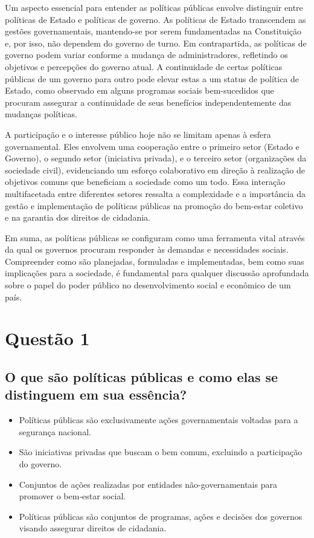 \documentclass[
   article,       
   12pt,          
   oneside,       
   a4paper,       
   english,       
   brazil,        
   sumario=tradicional
   ]{abntex2}
\begin{document}
Um aspecto essencial para entender as políticas públicas envolve distinguir entre políticas de Estado e políticas de governo. As políticas de Estado transcendem as gestões governamentais, mantendo-se por serem fundamentadas na Constituição e, por isso, não dependem do governo de turno. Em contrapartida, as políticas de governo podem variar conforme a mudança de administradores, refletindo os objetivos e percepções do governo atual. A continuidade de certas políticas públicas de um governo para outro pode elevar estas a um status de política de Estado, como observado em alguns programas sociais bem-sucedidos que procuram assegurar a continuidade de seus benefícios independentemente das mudanças políticas.

A participação e o interesse público hoje não se limitam apenas à esfera governamental. Eles envolvem uma cooperação entre o primeiro setor (Estado e Governo), o segundo setor (iniciativa privada), e o terceiro setor (organizações da sociedade civil), evidenciando um esforço colaborativo em direção à realização de objetivos comuns que beneficiam a sociedade como um todo. Essa interação multifacetada entre diferentes setores ressalta a complexidade e a importância da gestão e implementação de políticas públicas na promoção do bem-estar coletivo e na garantia dos direitos de cidadania.

Em suma, as políticas públicas se configuram como uma ferramenta vital através da qual os governos procuram responder às demandas e necessidades sociais. Compreender como são planejadas, formuladas e implementadas, bem como suas implicações para a sociedade, é fundamental para qualquer discussão aprofundada sobre o papel do poder público no desenvolvimento social e econômico de um país.
\section{Questão 1}
\subsection{O que são políticas públicas e como elas se distinguem em sua essência?}
\begin{itemize}
    \item Políticas públicas são exclusivamente ações governamentais voltadas para a segurança nacional.
    \item São iniciativas privadas que buscam o bem comum, excluindo a participação do governo.
    \item Conjuntos de ações realizadas por entidades não-governamentais para promover o bem-estar social.
    \item Políticas públicas são conjuntos de programas, ações e decisões dos governos visando assegurar direitos de cidadania.
\end{itemize}
\end{document}
